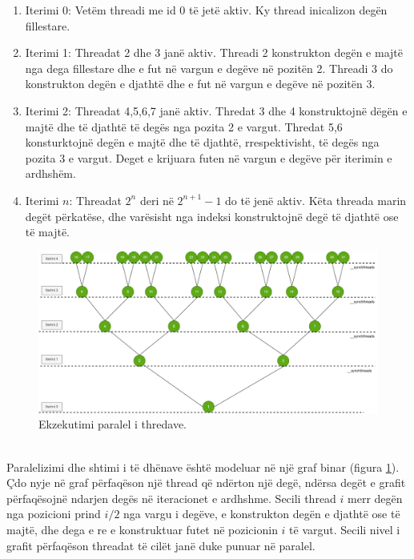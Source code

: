 \begin{enumerate}
    \item Iterimi 0: Vetëm threadi me id 0 të jetë aktiv. Ky thread inicalizon degën fillestare.
    \item Iterimi 1: Threadat 2 dhe 3 janë aktiv. Threadi 2 konstrukton degën e majtë nga dega fillestare dhe e fut në vargun e degëve në pozitën 2. Threadi 3 do konstrukton degën e djathtë dhe e fut në vargun e degëve në pozitën 3.
    \item Iterimi 2: Threadat 4,5,6,7 janë aktiv. Thredat 3 dhe 4 konstruktojnë dëgën e majtë dhe të djathtë të degës nga pozita 2 e vargut.  Thredat 5,6 konsturktojnë degën e majtë dhe të djathtë, rrespektivisht, të degës nga pozita 3 e vargut. Deget e krijuara futen në vargun e degëve për iterimin e ardhshëm. 
    \item Iterimi \(n\): Threadat \(2^n\) deri në \(2^{n+1}-1\) do të jenë aktiv. Këta threada marin degët përkatëse, dhe varësisht nga indeksi konstruktojnë degë të djathtë ose të majtë.  
\end{enumerate}


\begin{figure}[htbp]
    \centering
    \includegraphics[width=1\linewidth]{tree_6.png}
    \caption{Ekzekutimi paralel i thredave.}
    \label{fig:tree_threads}
\end{figure}


\noindent \\ Paralelizimi dhe shtimi i të dhënave është modeluar në një graf binar (figura \ref{fig:tree_threads}). Çdo nyje në graf përfaqëson një thread që ndërton një degë, ndërsa degët e grafit përfaqësojnë ndarjen degës në iteracionet e ardhshme. Secili thread \(i\)  merr degën nga pozicioni prind \(i/2\) nga vargu i degëve, e konstrukton degën e djathtë ose të majtë, dhe dega e re e konstruktuar futet në pozicionin  \(i\)  të vargut. Secili nivel i grafit përfaqëson threadat të cilët janë duke punuar në paralel. 

